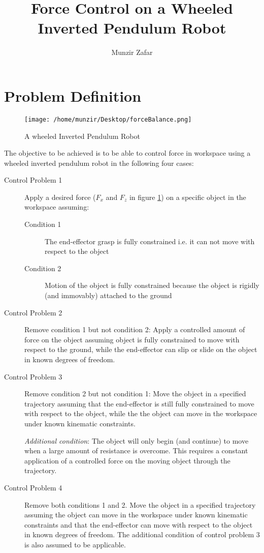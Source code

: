 \documentclass[a4paper,10pt]{article}
\title{Force Control on a Wheeled Inverted Pendulum Robot}
\author{Munzir Zafar}
\begin{document}
\maketitle

\begin{abstract}

\end{abstract}

\section{Problem Definition}

\begin{figure}[!ht]
\centering \texttt{[image: /home/munzir/Desktop/forceBalance.png]}
\caption{A wheeled Inverted Pendulum Robot}
\label{fig:model} 
\end{figure}

The objective to be achieved is to be able to control force in workspace using a wheeled inverted pendulum
robot in the following four cases:

\begin{description}
 \item[Control Problem 1] Apply a desired force ($F_x$ and $F_z$ in figure \ref{fig:model}) on a specific object in the 
 workspace assuming:
 \begin{description}
  \item[Condition 1] The end-effector grasp is fully constrained i.e. it can not move with respect to the object
  \item[Condition 2] Motion of the object is fully constrained 
  because the object is rigidly (and immovably) attached to the ground 
 \end{description}
 \item[Control Problem 2] Remove condition 1 but not condition 2: Apply a controlled amount of force on the object
 assuming object is fully constrained to move with respect to the ground, while the end-effector can slip or slide on the object 
 in known degrees of freedom.
 \item[Control Problem 3] Remove condition 2 but not condition 1: Move the object in a specified trajectory assuming that the end-effector
 is still fully constrained to move with respect to the object, while the the object can move in the workspace under known
 kinematic constraints. 
 
 \textit{Additional condition}: The object will only begin (and continue) to move when a large amount of 
 resistance is overcome. This requires a constant application of a controlled force on the moving object through the trajectory.
 \item[Control Problem 4] Remove both conditions 1 and 2. Move the object in a specified trajectory assuming the object can move in the workspace 
 under known kinematic constraints and that the end-effector can move with respect to the object in known
 degrees of freedom. The additional condition of control problem 3
 is also assumed to be applicable.
\end{description}
\end{document}
